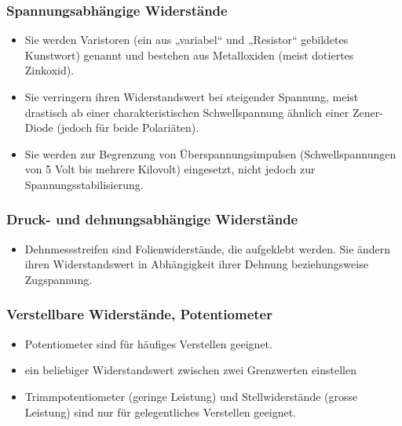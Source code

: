 \subsubsection{Spannungsabhängige Widerstände}
\begin{itemize}
  \item Sie werden Varistoren (ein aus „variabel“ und „Resistor“ gebildetes
  Kunstwort) genannt und bestehen aus Metalloxiden (meist dotiertes Zinkoxid).
  \item Sie verringern ihren Widerstandswert bei steigender Spannung, meist
  drastisch ab einer charakteristischen Schwellspannung ähnlich einer
  Zener-Diode (jedoch für beide Polariäten).
  \item Sie werden zur Begrenzung von Überspannungsimpulsen (Schwellspannungen
  von 5 Volt bis mehrere Kilovolt) eingesetzt, nicht jedoch zur Spannungsstabilisierung.
\end{itemize}

\subsubsection{Druck- und dehnungsabhängige Widerstände}
\begin{itemize}
  \item Dehnmessstreifen sind Folienwiderstände, die aufgeklebt werden. Sie
  ändern ihren Widerstandswert in Abhängigkeit ihrer Dehnung beziehungsweise
  Zugspannung.
\end{itemize}

\subsubsection{Verstellbare Widerstände, Potentiometer}
\begin{itemize}
  \item Potentiometer sind für häufiges Verstellen geeignet.
  \item ein beliebiger Widerstandswert zwischen zwei Grenzwerten einstellen
  \item Trimmpotentiometer (geringe Leistung) und Stellwiderstände (grosse
  Leistung) sind nur für gelegentliches Verstellen geeignet.
\end{itemize}

\newpage
